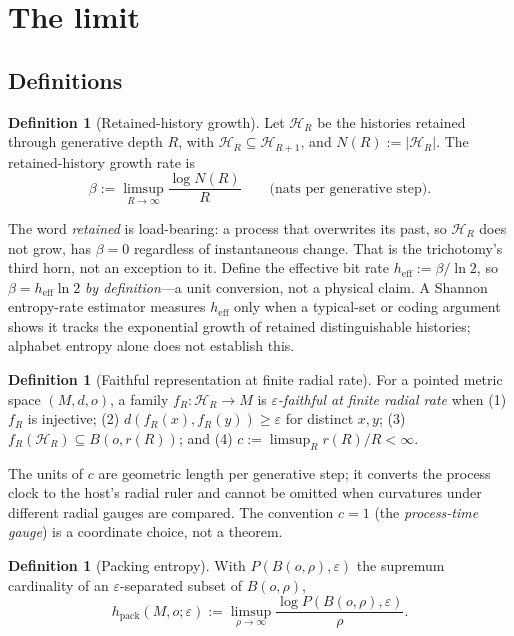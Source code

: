 \documentclass[11pt,reqno]{amsart}
\theoremstyle{plain}
\theoremstyle{definition}
\newtheorem{definition}[theorem]{Definition}
\newcommand{\hpack}{h_{\mathrm{pack}}}
\newcommand{\heff}{h_{\mathrm{eff}}}
\newcommand{\eps}{\varepsilon}
\begin{document}
\section{The limit}\label{sec:limit}

\subsection{Definitions}

\begin{definition}[Retained-history growth]
Let $\mathcal H_R$ be the histories retained through generative depth $R$, with $\mathcal H_R\subseteq\mathcal H_{R+1}$, and $N(R):=|\mathcal H_R|$. The retained-history growth rate is
\[
\beta:=\limsup_{R\to\infty}\frac{\log N(R)}{R}\qquad\text{(nats per generative step).}
\]
\end{definition}

The word \emph{retained} is load-bearing: a process that overwrites its past, so $\mathcal H_R$ does not grow, has $\beta=0$ regardless of instantaneous change. That is the trichotomy's third horn, not an exception to it. Define the effective bit rate $\heff:=\beta/\ln2$, so $\beta=\heff\ln2$ \emph{by definition}---a unit conversion, not a physical claim. A Shannon entropy-rate estimator measures $\heff$ only when a typical-set or coding argument shows it tracks the exponential growth of retained distinguishable histories; alphabet entropy alone does not establish this.

\begin{definition}[Faithful representation at finite radial rate]
For a pointed metric space $(M,d,o)$, a family $f_R:\mathcal H_R\to M$ is \emph{$\eps$-faithful at finite radial rate} when (1) $f_R$ is injective; (2) $d(f_R(x),f_R(y))\ge\eps$ for distinct $x,y$; (3) $f_R(\mathcal H_R)\subseteq B(o,r(R))$; and (4) $c:=\limsup_R r(R)/R<\infty$.
\end{definition}

The units of $c$ are geometric length per generative step; it converts the process clock to the host's radial ruler and cannot be omitted when curvatures under different radial gauges are compared. The convention $c=1$ (the \emph{process-time gauge}) is a coordinate choice, not a theorem.

\begin{definition}[Packing entropy]
With $P(B(o,\rho),\eps)$ the supremum cardinality of an $\eps$-separated subset of $B(o,\rho)$,
\[
\hpack(M,o;\eps):=\limsup_{\rho\to\infty}\frac{\log P(B(o,\rho),\eps)}{\rho}.
\]
\end{definition}
\end{document}
